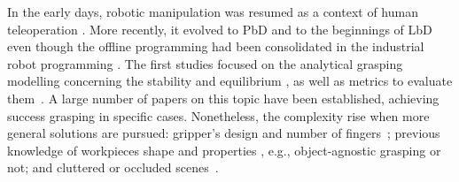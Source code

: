 In the early days, robotic manipulation was resumed as a context of human teleoperation \cite{bejczy1980sensors}. More recently, it evolved to \ac{PbD} \cite{ferreira2016stereo} and to the beginnings of \ac{LbD} \cite{suleman2011learning} even though the offline programming had been consolidated in the industrial robot programming \cite{de2020adaptpack,castro2020adaptpack}. The first studies focused on the analytical grasping modelling concerning the stability and equilibrium \cite{diziouglu1984mechanics, Nguyen1987_1, Nguyen1987_2, Ponce1995, Li2003}, as well as metrics to evaluate them~\cite{Ferrari, Bicchi2000, Roa2014}. A large number of papers on this topic have been established, achieving success grasping in specific cases. Nonetheless, the complexity rise when more general solutions are pursued: gripper's design and number of fingers~\cite{chen2020active}; previous knowledge of workpieces shape and properties \cite{babin2019stable,babin2019stable,bjornsson2018automated}, e.g., object-agnostic grasping or not; and cluttered or occluded scenes~\cite{d2020study}.

\begin{figure}[h]
\end{figure}

